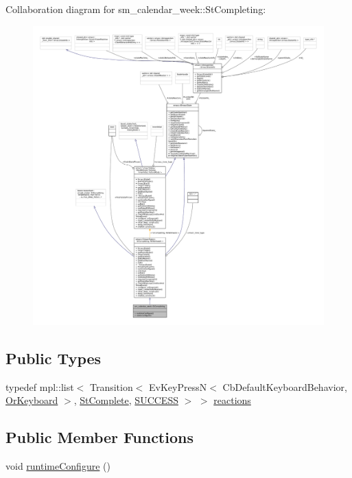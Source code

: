 Collaboration diagram for sm\+\_\+calendar\+\_\+week\+:\+:St\+Completing\+:
\nopagebreak
\begin{figure}[H]
\begin{center}
\leavevmode
\includegraphics[width=350pt]{structsm__calendar__week_1_1StCompleting__coll__graph}
\end{center}
\end{figure}
\subsection*{Public Types}
\begin{DoxyCompactItemize}
\item 
typedef mpl\+::list$<$ Transition$<$ Ev\+Key\+PressN$<$ Cb\+Default\+Keyboard\+Behavior, \hyperlink{classsm__calendar__week_1_1OrKeyboard}{Or\+Keyboard} $>$, \hyperlink{structsm__calendar__week_1_1StComplete}{St\+Complete}, \hyperlink{classSUCCESS}{S\+U\+C\+C\+E\+SS} $>$ $>$ \hyperlink{structsm__calendar__week_1_1StCompleting_ab93d532a6f82b095931053386a8aa89b}{reactions}
\end{DoxyCompactItemize}
\subsection*{Public Member Functions}
\begin{DoxyCompactItemize}
\item 
void \hyperlink{structsm__calendar__week_1_1StCompleting_ae4a6630ad812bdaef4bc08c0613c4694}{runtime\+Configure} ()
\end{DoxyCompactItemize}

